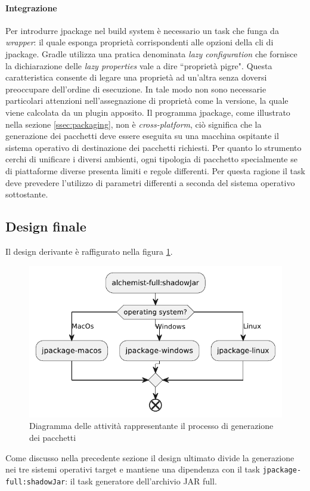 \paragraph{Integrazione} Per introdurre jpackage nel build system è necessario un task che funga da \textit{wrapper}: il quale esponga proprietà corrispondenti alle opzioni della \ac{cli} di jpackage. Gradle utilizza una pratica denominata \textit{lazy configuration} che fornisce la dichiarazione delle \textit{lazy properties} vale a dire ``proprietà pigre". Questa caratteristica consente di legare una proprietà ad un'altra senza doversi preoccupare dell'ordine di esecuzione. In tale modo non sono necessarie particolari attenzioni nell'assegnazione di proprietà come la versione, la quale viene calcolata da un plugin apposito. Il programma jpackage, come illustrato nella sezione \ref{ssec:packaging}, non è \textit{cross-platform}, ciò significa che la generazione dei pacchetti deve essere eseguita su una macchina ospitante il sistema operativo di destinazione dei pacchetti richiesti. Per quanto lo strumento cerchi di unificare i diversi ambienti, ogni tipologia di pacchetto specialmente se di piattaforme diverse presenta limiti e regole differenti. Per questa ragione il task deve prevedere l'utilizzo di parametri differenti a seconda del sistema operativo sottostante.

\subsection{Design finale} Il design derivante è raffigurato nella figura \ref{fig:gradle-jpackage-scheme}. 

\begin{figure}[htb]
	\centering
	\includegraphics[width=.8\linewidth]{figures/gradle-jpackage-scheme.pdf}
	\caption{Diagramma delle attività rappresentante il processo di generazione dei pacchetti}
	\label{fig:gradle-jpackage-scheme}
\end{figure}
\noindent Come discusso nella precedente sezione il design ultimato divide la generazione nei tre sistemi operativi target e mantiene una dipendenza con il task \texttt{jpackage-full:shadowJar}: il task generatore dell'archivio JAR full.

